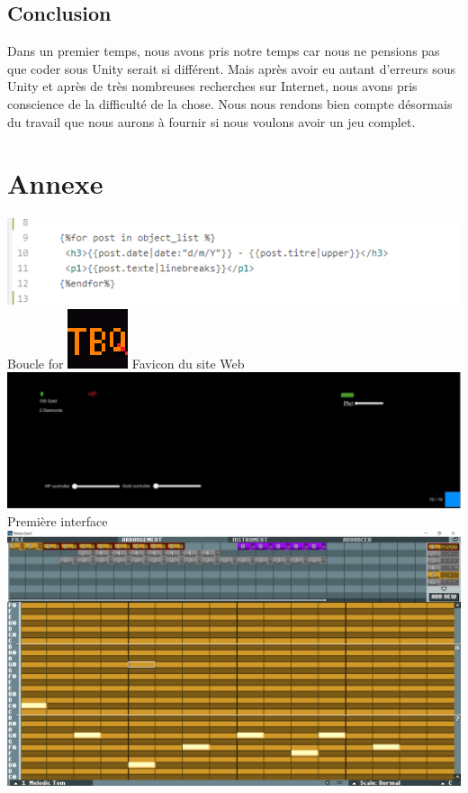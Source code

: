 \documentclass[]{extarticle}
\begin{document}
\begin{spacing}{1.25}
\section{Conclusion}
\bigbreak
\bigbreak
Dans un premier temps, nous avons pris notre temps car nous ne pensions pas que coder sous Unity serait si différent. Mais après avoir eu autant d'erreurs sous Unity et après de très nombreuses recherches sur Internet, nous avons pris conscience de la difficulté de la chose. Nous nous rendons bien compte désormais du travail que nous aurons à fournir si nous voulons avoir un jeu complet. 
\end{spacing}
\newpage
\section{Annexe}
\bigbreak
\bigbreak
\begin{center}
\includegraphics[scale = 1]{boucle_for.png}
\smallbreak
Boucle for
\bigbreak
\bigbreak
\includegraphics[scale = 1]{image_TBQ.png}
\smallbreak
Favicon du site Web
\bigbreak
\bigbreak
\includegraphics[scale = 0.32]{interface.jpg}
\smallbreak
Première interface
\bigbreak
\bigbreak
\includegraphics[scale = 0.18]{ceoil.png}

\end{center}
\end{document}
